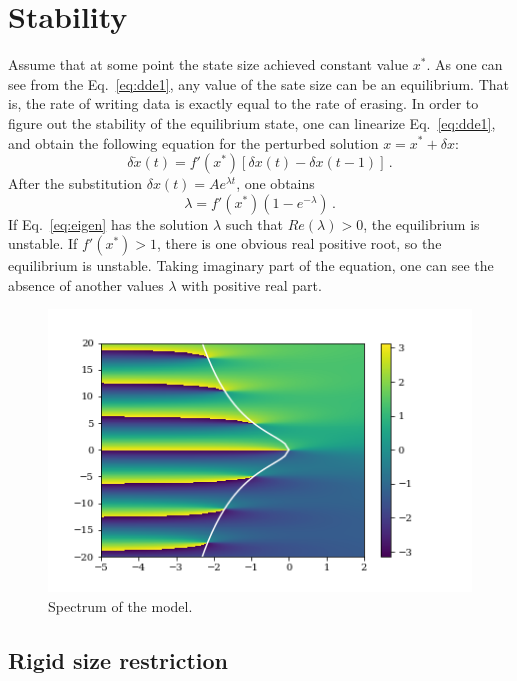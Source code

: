 \documentclass[preprint]{revtex4-1}
\begin{document}
\section{Stability}

Assume that at some point the state size achieved constant value $x^*$. As one
can see from the Eq.~\eqref{eq:dde1}, any value of the sate size can be an
equilibrium. That is, the rate of writing data is exactly equal to the rate of
erasing. In order to figure out the stability of the equilibrium state, one can
linearize Eq.~\eqref{eq:dde1}, and obtain the following equation for the
perturbed solution $x=x^*+\delta x$:
\begin{equation}
    \delta\dot{x}(t) = f'(x^*)[\delta x(t)-\delta x(t-1)]\,.
    \label{eq:perturb}
\end{equation}
After the substitution $\delta x(t) = Ae^{\lambda t}$, one obtains
\begin{equation}
    \lambda = f'(x^*)(1-e^{-\lambda})\,.
    \label{eq:eigen}
\end{equation}
If Eq.~\eqref{eq:eigen} has the solution $\lambda$ such that $Re(\lambda)>0$,
the equilibrium is unstable. If $f'(x^*)>1$, there is one obvious real positive
root, so the equilibrium is unstable. Taking imaginary part of the equation, one
can see the absence of another values $\lambda$ with positive real part.
\begin{figure}
    \includegraphics{eigenvals}
    \caption{
        \label{fig:eigen}
        Spectrum of the model.
    }
\end{figure}

\subsection{Rigid size restriction}
\end{document}
